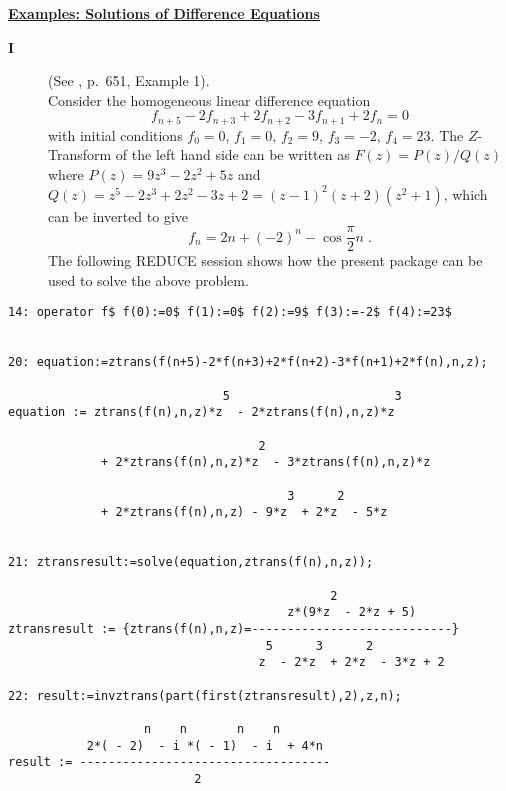 \underline {{\bf Examples: Solutions of Difference Equations}}

\begin{description}
\item[{\bf I}] (See \cite{Bronstein:1981}, p.\ 651, Example 1).\\
  Consider the homogeneous linear difference equation
  \[ f_{n+5} - 2 f_{n+3} + 2 f_{n+2} - 3 f_{n+1} + 2 f_{n}=0 \]
  with initial conditions $f_0=0$, $f_1=0$, $f_2=9$, $f_3=-2$,
  $f_4=23$. The $Z$-Transform of the left hand side can be written as
  $F(z)=P(z)/Q(z)$ where $P(z)=9z^3-2z^2+5z$ and
  $Q(z)=z^5-2z^3+2z^2-3z+2=(z-1)^2(z+2)(z^2+1)$, which can be inverted
  to give
  \[ f_n = 2n + (-2)^n - \cos \frac{\pi}{2}n\;. \]
  The following REDUCE session shows how the present package can be
  used to solve the above problem.
\end{description}

\begin{verbatim}
14: operator f$ f(0):=0$ f(1):=0$ f(2):=9$ f(3):=-2$ f(4):=23$


20: equation:=ztrans(f(n+5)-2*f(n+3)+2*f(n+2)-3*f(n+1)+2*f(n),n,z);

                              5                       3
equation := ztrans(f(n),n,z)*z  - 2*ztrans(f(n),n,z)*z

                                   2
             + 2*ztrans(f(n),n,z)*z  - 3*ztrans(f(n),n,z)*z

                                       3      2
             + 2*ztrans(f(n),n,z) - 9*z  + 2*z  - 5*z


21: ztransresult:=solve(equation,ztrans(f(n),n,z));

                                             2
                                       z*(9*z  - 2*z + 5)
ztransresult := {ztrans(f(n),n,z)=----------------------------}
                                    5      3      2
                                   z  - 2*z  + 2*z  - 3*z + 2

22: result:=invztrans(part(first(ztransresult),2),z,n);

                   n    n       n    n
           2*( - 2)  - i *( - 1)  - i  + 4*n
result := -----------------------------------
                          2
\end{verbatim}

